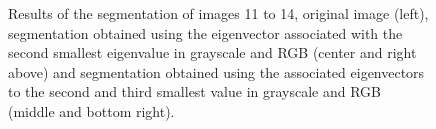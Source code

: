 \documentclass[conference]{IEEEtran}
\theoremstyle{definition}
\begin{document}
\begin{figure}[htbp]
\caption{Results of the segmentation of images 11 to 14, original image (left), segmentation obtained using the eigenvector associated with the second smallest eigenvalue in grayscale and RGB (center and right above) and segmentation obtained using the associated eigenvectors to the second and third smallest value in grayscale and RGB (middle and bottom right).}
\label{res2}
\end{figure}
\FloatBarrier
\end{document}
